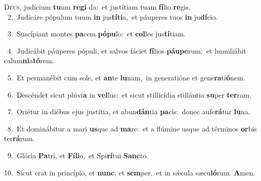 \lettrine{\initial\textcolor{\initialcolor}{D}}{eus,} judícium \textbf{tu}\-um \textbf{re}\-\textbf{gi} da:~\star et justítiam tuam \textbf{fí}\-lio \textbf{re}\-gis.\\
{\numbfont\textcolor{\numbcolor}{~2.}}~Judicáre pópulum tuum \textbf{in} jus\-\textbf{tí}\-\textbf{ti}a,~\star et páuperes tuos \textbf{in} ju\-\textbf{dí}\-cio.\par
{\numbfont\textcolor{\numbcolor}{~3.}}~Suscípiant montes \textbf{pa}\-cem \textbf{pó}\-\textbf{pu}lo:~\star et \textbf{col}\-les jus\-\textbf{tí}\-tiam.\par
{\numbfont\textcolor{\numbcolor}{~4.}}~Judicábit páuperes pópuli, et salvos fáciet \textbf{fí}\-lios \textbf{páu}\-\textbf{pe}rum:~\star et humiliábit calum\-\textbf{ni}\-a\-\textbf{tó}\-rem.\par
{\numbfont\textcolor{\numbcolor}{~5.}}~Et permanébit cum sole, et \textbf{an}\-te \textbf{lu}\-nam,~\star in generatióne et gene\-\textbf{ra}\-ti\-\textbf{ó}\-nem.\par
{\numbfont\textcolor{\numbcolor}{~6.}}~Descéndet sicut plúvi\textbf{a} in \textbf{vel}\-lus:~\star et sicut stillicídia stillántia \textbf{su}\-per \textbf{ter}\-ram.\par
{\numbfont\textcolor{\numbcolor}{~7.}}~Oriétur in diébus ejus justítia, et abun\-\textbf{dán}\-tia \textbf{pa}\-cis:~\star donec aufe\-\textbf{rá}\-tur \textbf{lu}\-na.\par
{\numbfont\textcolor{\numbcolor}{~8.}}~Et dominábitur a mari \textbf{us}\-que ad \textbf{ma}\-re:~\star et a flúmine usque ad términos \textbf{or}\-bis ter\-\textbf{rá}\-rum.\par
{\numbfont\textcolor{\numbcolor}{~9.}}~Glória \textbf{Pa}\-tri, et \textbf{Fí}\-\textbf{li}o,~\star et Spi\-\textbf{rí}\-tui \textbf{Sanc}\-to.\par
{\numbfont\textcolor{\numbcolor}{10.}}~Sicut erat in princípio, et \textbf{nunc}\-, et \textbf{sem}\-per,~\star et in sǽcula sæcu\-\textbf{ló}\-rum. \textbf{A}\-men.\par
